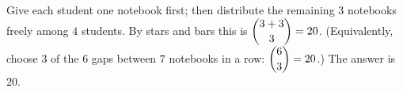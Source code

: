 Give each student one notebook first; then distribute the remaining $3$ notebooks freely among $4$ students. By stars and bars this is $\dbinom{3+3}{3}=20$. (Equivalently, choose $3$ of the $6$ gaps between $7$ notebooks in a row: $\dbinom63=20$.) The answer is $\boxed{20}$.

